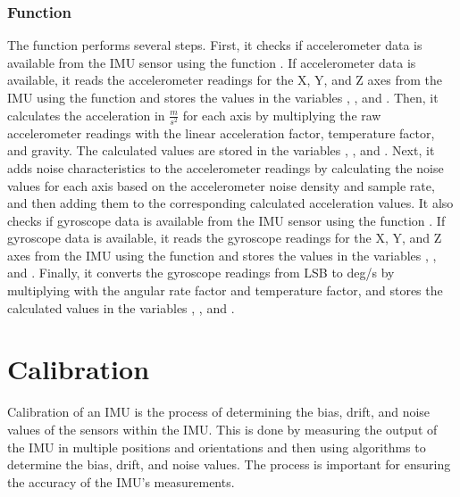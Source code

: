 \subsubsection{Function }
The function  performs several steps. First, it checks if accelerometer data is available from the IMU sensor using the function . If accelerometer data is available, it reads the accelerometer readings for the X, Y, and Z axes from the IMU using the function  and stores the values in the variables , , and . Then, it calculates the acceleration in $\frac{m}{s^2}$ for each axis by multiplying the raw accelerometer readings with the linear acceleration factor, temperature factor, and gravity. The calculated values are stored in the variables , , and . Next, it adds noise characteristics to the accelerometer readings by calculating the noise values for each axis based on the accelerometer noise density and sample rate, and then adding them to the corresponding calculated acceleration values. It also checks if gyroscope data is available from the IMU sensor using the function . If gyroscope data is available, it reads the gyroscope readings for the X, Y, and Z axes from the IMU using the function  and stores the values in the variables , , and . Finally, it converts the gyroscope readings from LSB to deg/s by multiplying with the angular rate factor and temperature factor, and stores the calculated values in the variables , , and .






\section{Calibration}  \label{Chap: Calibration}


Calibration of an IMU  is the process of determining the bias, drift, and noise values of the sensors within the IMU. \cite{wahyudi:2011}This is done by measuring the output of the IMU in multiple positions and orientations and then using algorithms to determine the bias, drift, and noise values. The process is important for ensuring the accuracy of the IMU's measurements.\cite{Vectornav:2021}

